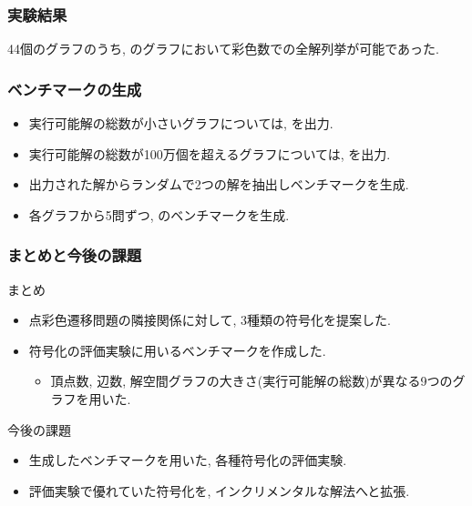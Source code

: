 \documentclass[dvipdfmx,11pt]{beamer}
\begin{document}

\begin{frame}\frametitle{実験結果}
  44個のグラフのうち, のグラフにおいて彩色数での全解列挙が可能であった.
  
  \begin{table}[t]
    \centering
    
  \end{table}
\end{frame}




\begin{frame}\frametitle{ベンチマークの生成}

  \begin{itemize}
    \item 実行可能解の総数が小さいグラフについては, を出力.
    \item 実行可能解の総数が100万個を超えるグラフについては, を出力.
    \item 出力された解からランダムで2つの解を抽出しベンチマークを生成.
    \item 各グラフから5問ずつ, のベンチマークを生成.
  \end{itemize}

\end{frame}


\begin{frame}\frametitle{まとめと今後の課題}

  \begin{block}{まとめ}
    \begin{itemize}
      \item 点彩色遷移問題の隣接関係に対して, 3種類の符号化を提案した.
      \item 符号化の評価実験に用いるベンチマークを作成した.
      \begin{itemize}
        \item 頂点数, 辺数, 解空間グラフの大きさ(実行可能解の総数)が異なる9つのグラフを用いた.
      \end{itemize}
    \end{itemize}
  \end{block}
  
  \begin{alertblock}{今後の課題}
    \begin{itemize}
      \item 生成したベンチマークを用いた, 各種符号化の評価実験.
      \item 評価実験で優れていた符号化を, インクリメンタルな解法へと拡張.
    \end{itemize}
  \end{alertblock}

\end{frame}

\end{document}
